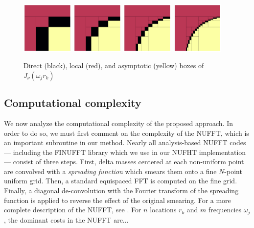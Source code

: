 \begin{figure}
    \centering
    \includegraphics[width=0.23\textwidth]{./figures/nufht_boxes_lvl1.pdf}
    \hfill
    \includegraphics[width=0.23\textwidth]{./figures/nufht_boxes_lvl2.pdf}
    \hfill
    \includegraphics[width=0.23\textwidth]{./figures/nufht_boxes_lvl3.pdf}
    \hfill
    \includegraphics[width=0.23\textwidth]{./figures/nufht_boxes_lvl4.pdf}
    \caption{Direct (black), local (red), and asymptotic (yellow) boxes of
    $J_\nu(\omega_j r_k)$}
\end{figure}

\subsection{Computational complexity}

We now analyze the computational complexity of the proposed approach. In order
to do so, we must first comment on the complexity of the NUFFT, which is an
important subroutine in our method. Nearly all analysis-based NUFFT codes ---
including the FINUFFT library \cite{barnett2019parallel} which we use in our
NUFHT implementation --- consist of three steps. First, delta masses centered at
each non-uniform point are convolved with a \textit{spreading function} which
smears them onto a fine $N$-point uniform grid. Then, a standard equispaced FFT
is computed on the fine grid. Finally, a diagonal de-convolution with the
Fourier transform of the spreading function is applied to reverse the effect of
the original smearing. For a more complete description of the NUFFT, see
\todocite. For $n$ locations $r_k$ and $m$ frequencies $\omega_j$, the dominant
costs in the NUFFT are... 

